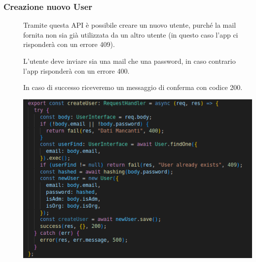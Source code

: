 \documentclass{article}
\begin{document}
\subsubsection{Creazione nuovo User}
\begin{description}
    \item[] Tramite questa API è possibile creare un nuovo utente, purché la mail fornita non sia già utilizzata da un altro utente (in questo caso l'app ci risponderà con un errore 409).
    \item[] L'utente deve inviare sia una mail che una password, in caso contrario l'app risponderà con un errore 400.
    \item[] In caso di successo riceveremo un messaggio di conferma con codice 200.
    \item[] \begin{center}
            \includegraphics[scale=0.5]{newUser.png}
        \end{center}
\end{description}
\clearpage
\end{document}
